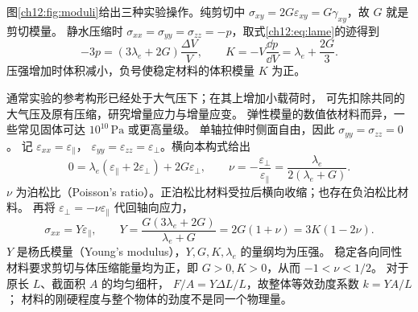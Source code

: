 图\ref{ch12:fig:moduli}给出三种实验操作。纯剪切中
$\sigma_{xy}=2G\varepsilon_{xy}=G\gamma_{xy}$，故 $G$ 就是剪切模量。
静水压缩时 $\sigma_{xx}=\sigma_{yy}=\sigma_{zz}=-p$，取式\eqref{ch12:eq:lame}的迹得到
\begin{equation}
 -3p=(3\lambda_e+2G)\frac{\Delta V}{V},\qquad
 K=-V\frac{\dd p}{\dd V}=\lambda_e+\frac{2G}{3}.
 \label{ch12:eq:bulk}
\end{equation}
压强增加时体积减小，负号使稳定材料的体积模量 $K$ 为正。

\begin{center}
\label{ch12:fig:moduli}
\end{center}

通常实验的参考构形已经处于大气压下；在其上增加小载荷时，
可先扣除共同的大气压及原有压缩，研究增量应力与增量应变。
弹性模量的数值依材料而异，一些常见固体可达 $10^{10}\,\mathrm{Pa}$ 或更高量级。
单轴拉伸时侧面自由，因此 $\sigma_{yy}=\sigma_{zz}=0$。
记 $\varepsilon_{xx}=\varepsilon_\parallel$，
$\varepsilon_{yy}=\varepsilon_{zz}=\varepsilon_\perp$。横向本构式给出
\[
 0=\lambda_e(\varepsilon_\parallel+2\varepsilon_\perp)+2G\varepsilon_\perp,
 \qquad
 \nu=-\frac{\varepsilon_\perp}{\varepsilon_\parallel}
     =\frac{\lambda_e}{2(\lambda_e+G)}.
\]
$\nu$ 为泊松比（Poisson's ratio）。正泊松比材料受拉后横向收缩；也存在负泊松比材料。
再将 $\varepsilon_\perp=-\nu\varepsilon_\parallel$ 代回轴向应力，
\begin{equation}
 \sigma_{xx}=Y\varepsilon_\parallel,\qquad
 Y=\frac{G(3\lambda_e+2G)}{\lambda_e+G}
  =2G(1+\nu)=3K(1-2\nu).
 \label{ch12:eq:young}
\end{equation}
$Y$ 是杨氏模量（Young's modulus），$Y,G,K,\lambda_e$ 的量纲均为压强。
稳定各向同性材料要求剪切与体压缩能量均为正，即 $G>0,K>0$，从而 $-1<\nu<1/2$。
对于原长 $L$、截面积 $A$ 的均匀细杆，
$F/A=Y\Delta L/L$，故整体等效劲度系数 $k=YA/L$；
材料的刚硬程度与整个物体的劲度不是同一个物理量。

